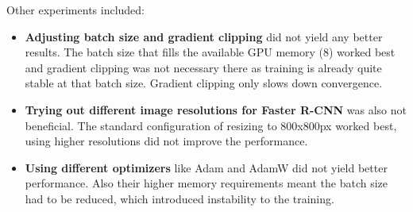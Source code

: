 Other experiments included:

\begin{itemize}
	\item \textbf{Adjusting batch size and gradient clipping} did not yield any better results. The batch size that fills the available GPU memory (8) worked best and gradient clipping was not necessary there as training is already quite stable at that batch size. Gradient clipping only slows down convergence.
	\item \textbf{Trying out different image resolutions for Faster R-CNN} was also not beneficial. The standard configuration of resizing to 800x800px worked best, using higher resolutions did not improve the performance.
	\item \textbf{Using different optimizers} like Adam and AdamW did not yield better performance. Also their higher memory requirements meant the batch size had to be reduced, which introduced instability to the training.
\end{itemize}



